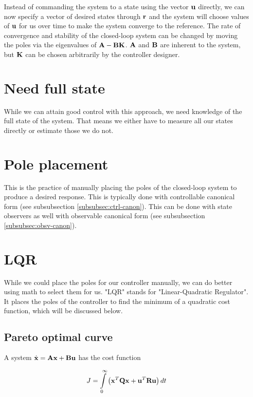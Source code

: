 Instead of commanding the system to a state using the vector $\mathbf{u}$ directly,
we can now specify a vector of desired states through $\mathbf{r}$ and the system
will choose values of $\mathbf{u}$ for us over time to make the system converge to
the reference. The rate of convergence and stability of the closed-loop system
can be changed by moving the poles via the eigenvalues of $\mathbf{A} -
\mathbf{B}\mathbf{K}$. $\mathbf{A}$ and $\mathbf{B}$ are inherent to the system, but
$\mathbf{K}$ can be chosen arbitrarily by the controller designer.

\section{Need full state}

While we can attain good control with this approach, we need knowledge of the
full state of the system. That means we either have to measure all our states
directly or estimate those we do not.

\section{Pole placement}

This is the practice of manually placing the poles of the closed-loop system to
produce a desired response. This is typically done with controllable canonical
form (see subsubsection \ref{subsubsec:ctrl-canon}). This can be done with state
observers as well with observable canonical form (see subsubsection
\ref{subsubsec:obsv-canon}).

\section{LQR}

While we could place the poles for our controller manually, we can do better
using math to select them for us. "LQR" stands for "Linear-Quadratic Regulator".
It places the poles of the controller to find the minimum of a quadratic cost
function, which will be discussed below.

\subsection{Pareto optimal curve}

A system $\dot{\mathbf{x}} = \mathbf{A}\mathbf{x} + \mathbf{B}\mathbf{u}$ has the cost function

\begin{equation*}
  J = \int\limits_0^\infty \left(\mathbf{x}^T\mathbf{Q}\mathbf{x} +
    \mathbf{u}^T\mathbf{R}\mathbf{u}\right) dt
\end{equation*}

